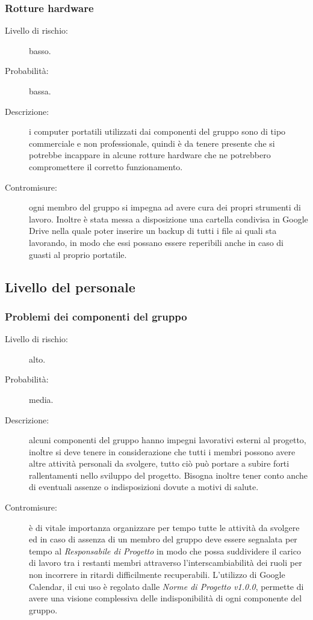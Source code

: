 \subsubsection{Rotture hardware}
\begin{description}
	\item[Livello di rischio:] basso.
	\item[Probabilità:] bassa.
	\item[Descrizione:] i computer portatili utilizzati dai componenti del gruppo sono di tipo commerciale e non professionale, quindi è da tenere presente che si potrebbe incappare in alcune rotture hardware che ne potrebbero compromettere il corretto funzionamento.
	\item[Contromisure:] ogni membro del gruppo si impegna ad avere cura dei propri strumenti di lavoro. Inoltre è stata messa a disposizione una cartella condivisa in Google Drive nella quale poter inserire un backup di tutti i file ai quali sta lavorando, in modo che essi possano essere reperibili anche in caso di guasti al proprio portatile.
\end{description}

\subsection{Livello del personale}
\subsubsection{Problemi dei componenti del gruppo}
\begin{description}
	\item[Livello di rischio:] alto.
	\item[Probabilità:] media.
	\item[Descrizione:] alcuni componenti del gruppo hanno impegni lavorativi esterni al progetto, inoltre si deve tenere in considerazione che tutti i membri possono avere altre attività personali da svolgere, tutto ciò può portare a subire forti rallentamenti nello sviluppo del progetto. Bisogna inoltre tener conto anche di eventuali assenze o indisposizioni dovute a motivi di salute.
	\item[Contromisure:] è di vitale importanza organizzare per tempo tutte le attività da svolgere ed in caso di assenza di un membro del gruppo deve essere segnalata per tempo al \textit{Responsabile di Progetto} in modo che possa suddividere il carico di lavoro tra i restanti membri attraverso l'interscambiabilità dei ruoli per non incorrere in ritardi difficilmente recuperabili. L'utilizzo di Google Calendar, il cui uso è regolato dalle \textit{Norme di Progetto v1.0.0}, permette di avere una visione complessiva delle indisponibilità di ogni componente del gruppo. 
\end{description}
